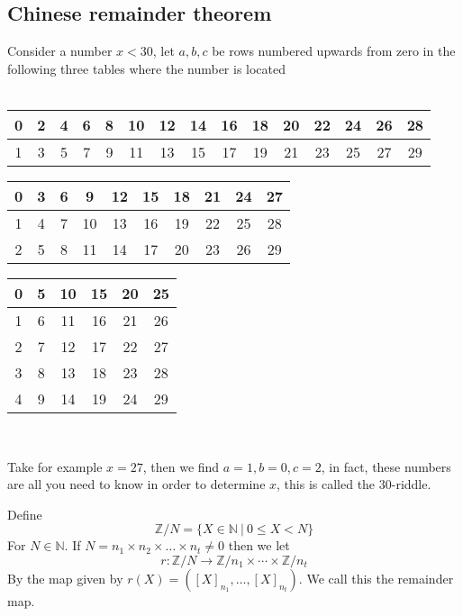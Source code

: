 \subsection{Chinese remainder theorem}
\begin{exmp}
 Consider a number $x<30$, let $a,b,c$ be rows numbered upwards from zero in the following three tables where the number is located
\\\\\begin{centering}\begin{tabular}{|ccccccccccccccc|}
    \hline
    0 & 2 & 4 & 6 & 8 & 10 & 12 & 14 & 16 & 18 & 20 & 22 & 24 & 26 & 28 \\
    \hline
    1 & 3 & 5 & 7 & 9 & 11 & 13 & 15 & 17 & 19 & 21 & 23 & 25 & 27 & 29 \\
    \hline
\end{tabular}

\begin{tabular}{|cccccccccc|}
    \hline
    0 & 3 & 6 & 9 & 12 & 15 & 18 & 21 & 24 & 27 \\
    \hline
    1 & 4 & 7 & 10 & 13 & 16 & 19 & 22 & 25 & 28 \\
    \hline
    2 & 5 & 8 & 11 & 14 & 17 & 20 & 23 & 26 & 29 \\
    \hline
\end{tabular}

\begin{tabular}{|cccccc|}
    \hline
    0 & 5 & 10 & 15 & 20 & 25 \\ 
    \hline
    1 & 6 & 11 & 16 & 21 & 26 \\
    \hline
    2 & 7 & 12 & 17 & 22 & 27 \\
    \hline
    3 & 8 & 13 & 18 & 23 & 28 \\
    \hline
    4 & 9 & 14 & 19 & 24 & 29 \\
    \hline
\end{tabular}\\\end{centering}\vskip 10pt
Take for example $x=27$, then we find $a=1,b=0,c=2$, in fact, these numbers are all you need to know in order to determine $x$, this is called the 30-riddle.
\end{exmp}
\begin{defi}
    Define
    \[
        \mathbb{Z}/N=\{X\in\mathbb{N}~|~0\leq X<N\}
    \]
    For $N\in\mathbb{N}$. If $N=n_{1}\times n_{2}\times\ldots\times n_{t}\neq 0$ then we let
    \[
        r:\mathbb{Z}/N\rightarrow\mathbb{Z}/n_{1}\times\cdots\times\mathbb{Z}/n_{t}
    \]
    By the map given by $r(X)=([X]_{n_{1}},\ldots,[X]_{n_{t}})$. We call this the remainder map.
\end{defi}
